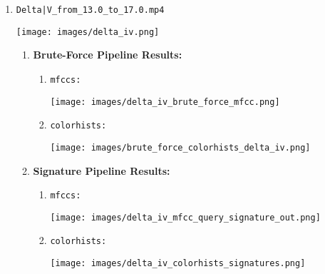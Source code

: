 \documentclass{article}
\begin{document}
\begin{enumerate}
    \item\texttt{Delta|V\_from\_13.0\_to\_17.0.mp4}\begin{center}
        \texttt{[image: images/delta\_iv.png]}
    \end{center}\begin{enumerate}
        \item \textbf{Brute-Force Pipeline Results:} \begin{enumerate}
            \item \texttt{mfccs:}
            \begin{center}
                \texttt{[image: images/delta\_iv\_brute\_force\_mfcc.png]}
            \end{center}
            \item \texttt{colorhists:}
                        \begin{center}
                \texttt{[image: images/brute\_force\_colorhists\_delta\_iv.png]}
            \end{center}
            
        \end{enumerate}
        \item \textbf{Signature Pipeline Results:}\begin{enumerate}
            \item \texttt{mfccs:}
            \begin{center}
                \texttt{[image: images/delta\_iv\_mfcc\_query\_signature\_out.png]}
            \end{center}
            \item \texttt{colorhists:}            \begin{center}
                \texttt{[image: images/delta\_iv\_colorhists\_signatures.png]}
            \end{center}
            
        \end{enumerate}
    \end{enumerate}
    
\end{enumerate}
\end{document}
